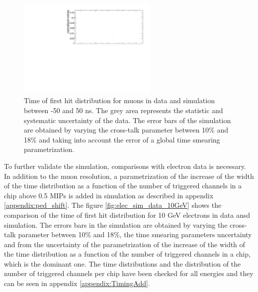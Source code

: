 \begin{figure}[htbp!]
	\centering
	\includegraphics[width=0.6\textwidth]{../Thesis_Plots/Timing/Muons/Plots/Comparison_MokkaDD4hepData_Muons.pdf}
	\caption{Time of first hit distribution for muons in data and simulation between -50 and 50 ns. The grey area represents the statistic and systematic uncertainty of the data. The error bars of the simulation are obtained by varying the cross-talk parameter between 10\% and 18\% and taking into account the error of a global time smearing parametrization.}
	\label{fig:sim_data_muon}
\end{figure}

To further validate the simulation, comparisons with electron data is necessary. In addition to the muon resolution, a parametrization of the increase of the width of the time distribution as a function of the number of triggered channels in a chip above 0.5 MIPs is added in simulation as described in appendix \ref{appendix:ped_shift}. The figure \ref{fig:elec_sim_data_10GeV} shows the comparison of the time of first hit distribution for 10 GeV electrons in data ansd simulation. The errors bars in the simulation are obtained by varying the cross-talk parameter between 10\% and 18\%, the time smearing parameters uncertainty and from the uncertainty of the parametrization of the increase of the width of the time distribution as a function of the number of triggered channels in a chip, which is the dominant one. The time distributions and the distribution of the number of triggered channels per chip have been checked for all energies and they can be seen in appendix \ref{appendix:TimingAdd}.

